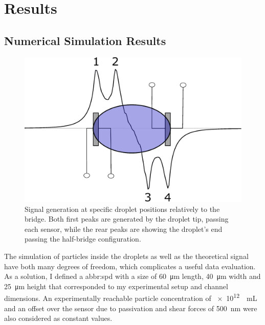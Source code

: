 \chapter{Results}
\section{Numerical Simulation Results}
\begin{figure}
	\centering
	\includegraphics[clip,width=\linewidth]{Ressourcen/IMG/Signal-Bridge}
	\caption{Signal generation at specific droplet positions relatively to the bridge. Both first peaks are generated by the droplet tip, passing each sensor, while the rear peaks are showing the droplet's end passing the half-bridge configuration.}
	\label{fig:res:bridge}
\end{figure}
The simulation of particles inside the droplets as well as the theoretical signal have both many degrees of freedom, which complicates a useful data evaluation. As a solution, I defined a \acrfull{abbr:spd} with a size of \SI{60}{\micro\meter} length, \SI{40}{\micro\meter} width  and \SI{25}{\micro\meter} height that corresponded to my experimental setup and channel dimensions. An experimentally reachable particle concentration of \SI{e12}{\per\milli\liter} and an offset over the sensor due to passivation and shear forces of \SI{500}{\nano\meter} were also considered as constant values.

